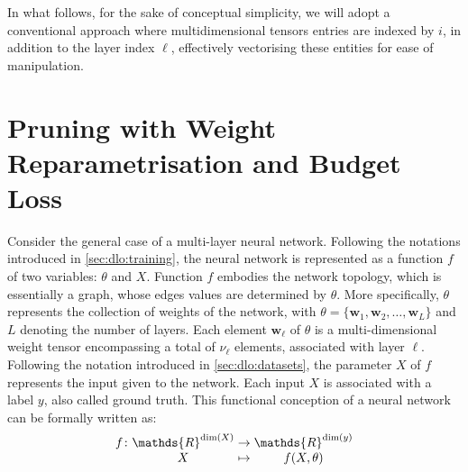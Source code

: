 In what follows, for the sake of conceptual simplicity, we will adopt a
conventional approach where multidimensional tensors entries are indexed by $i$,
in addition to the layer index $\ell$, effectively vectorising these entities
for ease of manipulation. \\



\section{Pruning with Weight Reparametrisation and Budget Loss}\label{sec:chap1:pruning}
Consider the general case of a multi-layer neural network. Following the
notations introduced in \cref{sec:dlo:training}, the neural network is
represented as a function $f$ of two variables: $\theta$ and $X$. Function $f$
embodies the network topology, which is essentially a graph, whose edges values
are determined by $\theta$. More specifically, $\theta$ represents the
collection of weights of the network, with $\theta = \{\mathbf{w}_1,
\mathbf{w}_2, \ldots, \mathbf{w}_L\}$ and $L$ denoting the number of layers.
Each element $\mathbf{w}_\ell$ of $\theta$ is a multi-dimensional weight tensor
encompassing a total of $\nu_\ell$ elements, associated with layer $\ell$.
Following the notation introduced in \cref{sec:dlo:datasets}, the parameter $X$
of $f$ represents the input given to the network. Each input $X$ is associated
with a label $y$, also called ground truth. This functional conception of a
neural network can be formally written as:\\


\begin{equation}
  \begingroup
  \setlength\arraycolsep{0pt}
  f \colon\begin{array}[t]{c >{{}}c<{{}} c}
    \mathds{R}^{\dim (X)} & \to     & \mathds{R}^{\dim (y)} \\
    X                     & \mapsto & f(X, \theta)
  \end{array}
  \endgroup
\end{equation}\\

